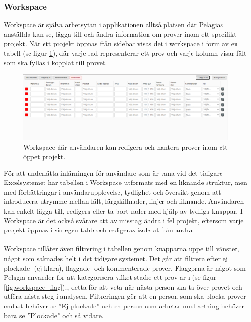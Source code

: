 \subsubsection{Workspace}

Workspace är själva arbetsytan i applikationen alltså platsen där Pelagias anställda kan se, lägga till och ändra information om prover inom ett specifikt projekt.
När ett projekt öppnas från sidebar visas det i workspace i form av en tabell (se figur \ref{fig:workspace}), där varje rad representerar ett prov och varje kolumn visar fält som ska fyllas i kopplat till provet.
\begin{figure}[H]
    \centering
    \includegraphics[width=1\linewidth]{images/workspace.PNG}
    \caption{Workspace där användaren kan redigera och hantera prover inom ett öppet projekt.}
    \label{fig:workspace}
\end{figure}
\noindent För att underlätta inlärningen för användare som är vana vid det tidigare Excelsystemet har tabellen i Workspace utformats med en liknande struktur, men med förbättringar i användarupplevelse, tydlighet och översikt genom att introducera utrymme mellan fält, färgskillnader, linjer och liknande. 
Användaren kan enkelt lägga till, redigera eller ta bort rader med hjälp av tydliga knappar. I Workspace är det också svårare att av misstag ändra i fel projekt, eftersom varje projekt öppnas i sin egen tabb och redigeras isolerat från andra.
\\\\
Workspace tillåter även filtrering i tabellen genom knapparna uppe till vänster, något som saknades helt i det tidigare systemet. Det går att filtrera efter ej plockade- (ej klara), flaggade- och kommenterade prover.
Flaggorna är något som Pelagia använder för att kategorisera vilket stadie ett prov är i (se figur \ref{fig:workspace_flag})., detta för att veta när nästa person ska ta över provet och utföra nästa steg i analysen. Filtreringen gör att en person som ska plocka prover endast behöver se ''Ej plockade'' och en person som arbetar med artning behöver bara se ''Plockade'' och så vidare.

